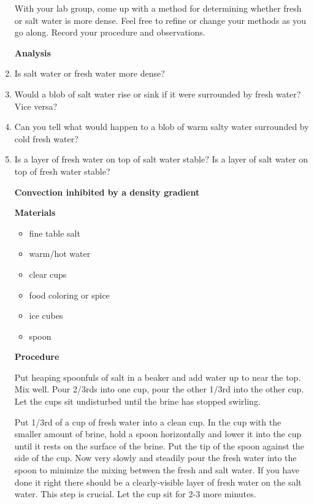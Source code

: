 \documentclass[letterpaper,11pt]{article}
\begin{document}
\begin{enumerate}
With your lab group, come up with a method for determining whether fresh 
or salt water is more dense.  Feel free to refine or change your methods 
as you go along.  Record your procedure and observations.

\vspace{.1in}
\textbf{Analysis}
\vspace{.1in}

\item Is salt water or fresh water more dense?
\item Would a blob of salt water rise or sink if it were surrounded by fresh water?  Vice versa?
\item Can you tell what would happen to a blob of warm salty water surrounded by cold fresh water?
\item Is a layer of fresh water on top of salt water stable?  Is a layer of salt water on top of fresh water stable?
\vspace{.1in}

\textbf{\Large{Convection inhibited by a density gradient}}

\vspace{.1in}
\textbf{Materials}
\vspace{.1in}

\begin{itemize}
\item fine table salt
\item warm/hot water
\item clear cups
\item food coloring or spice
\item ice cubes
\item spoon
\end{itemize}

\vspace{.1in}
\textbf{Procedure}
\vspace{.1in}

Put  heaping spoonfuls of salt in a beaker and add water up to near the top.  Mix well.  Pour 2/3rds into one cup, pour the other 1/3rd into the other cup.  Let the cups sit undisturbed until the brine has stopped swirling.

Put 1/3rd of a cup of fresh water into a clean cup.  In the cup with the smaller amount of brine, hold a spoon horizontally and lower it into the cup until it rests on the surface of the brine.  Put the tip of the spoon against the side of the cup.  Now very slowly and steadily pour the fresh water into the spoon to minimize the mixing between the fresh and salt water.  If you have done it right there should be a clearly-visible layer of fresh water on the salt water.  This step is crucial.  Let the cup sit for 2-3 more minutes.


\end{enumerate}
\end{document}
